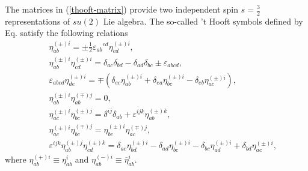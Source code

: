 \documentclass[12pt,epsf]{article}
\begin{document}
The matrices in (\ref{thooft-matrix}) provide two independent spin $s=\frac{3}{2}$ representations
of $su(2)$ Lie algebra.
The so-called 't Hooft symbols defined by Eq.  satisfy the following relations \cite{joy-jhep,opy-jhep}
\begin{eqnarray} \label{self-eta}
&& \eta^{(\pm)i}_{ab} = \pm \frac{1}{2} {\varepsilon_{ab}}^{cd}
\eta^{(\pm)i}_{cd}, \\
\label{proj-eta}
&& \eta^{(\pm)i}_{ab} \eta^{(\pm)i}_{cd} =
\delta_{ac}\delta_{bd}
-\delta_{ad}\delta_{bc} \pm \varepsilon_{abcd}, \\
\label{self-eigen}
&& \varepsilon_{abcd} \eta^{(\pm)i}_{de} = \mp (
\delta_{ec} \eta^{(\pm)i}_{ab} + \delta_{ea} \eta^{(\pm)i}_{bc} -
\delta_{eb} \eta^{(\pm)i}_{ac} ), \\
\label{eta-etabar}
&& \eta^{(\pm)i}_{ab} \eta^{(\mp)j}_{ab}=0, \\
\label{eta^2}
&& \eta^{(\pm)i}_{ac}\eta^{(\pm)j}_{bc} =\delta^{ij}\delta_{ab} +
\varepsilon^{ijk}\eta^{(\pm)k}_{ab}, \\
\label{eta-ex}
&& \eta^{(\pm)i}_{ac}\eta^{(\mp)j}_{bc} =
\eta^{(\pm)i}_{bc}\eta^{(\mp)j}_{ac}, \\
\label{eta-o4-algebra}
&& \varepsilon^{ijk} \eta^{(\pm)j}_{ab} \eta^{(\pm)k}_{cd} =
    \delta_{ac} \eta^{(\pm)i}_{bd} - \delta_{ad} \eta^{(\pm)i}_{bc}
    - \delta_{bc} \eta^{(\pm)i}_{ad} + \delta_{bd} \eta^{(\pm)i}_{ac},
\end{eqnarray}
where $\eta^{(+)i}_{ab} \equiv \eta^i_{ab}$ and $\eta^{(-)i}_{ab} \equiv {\overline
\eta}^i_{ab}$.
\end{document}

